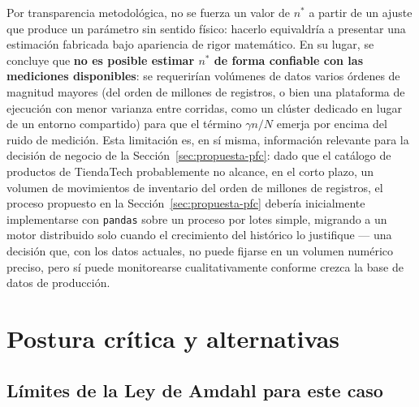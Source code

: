 \documentclass[11pt,a4paper]{article}
\begin{document}
    Por transparencia metodológica, no se fuerza un valor de $n^{*}$ a
    partir de un ajuste que produce un parámetro sin sentido físico:
    hacerlo equivaldría a presentar una estimación fabricada bajo
    apariencia de rigor matemático. En su lugar, se concluye que
    \textbf{no es posible estimar $n^{*}$ de forma confiable con las
    mediciones disponibles}: se requerirían volúmenes de datos varios
    órdenes de magnitud mayores (del orden de millones de registros, o
    bien una plataforma de ejecución con menor varianza entre corridas,
    como un clúster dedicado en lugar de un entorno compartido) para que
    el término $\gamma n/N$ emerja por encima del ruido de medición. Esta
    limitación es, en sí misma, información relevante para la decisión de
    negocio de la Sección~\ref{sec:propuesta-pfc}: dado que el catálogo de
    productos de TiendaTech probablemente no alcance, en el corto plazo,
    un volumen de movimientos de inventario del orden de millones de
    registros, el proceso propuesto en la Sección~\ref{sec:propuesta-pfc}
    debería inicialmente implementarse con \texttt{pandas} sobre un
    proceso por lotes simple, migrando a un motor distribuido solo cuando
    el crecimiento del histórico lo justifique --- una decisión que, con
    los datos actuales, no puede fijarse en un volumen numérico preciso,
    pero sí puede monitorearse cualitativamente conforme crezca la base de
    datos de producción.


    \section{Postura crítica y alternativas}
    \label{sec:postura-critica}

    \subsection{Límites de la Ley de Amdahl para este caso}
\end{document}
